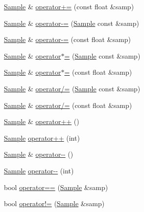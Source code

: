 \begin{DoxyCompactItemize}
\item 
\hyperlink{classDSG_1_1Signal_1_1Sample}{Sample} \& \hyperlink{classDSG_1_1Signal_1_1Sample_afe97756dc97b7080678daab56f384e86}{operator+=} (const float \&samp)
\item 
\hyperlink{classDSG_1_1Signal_1_1Sample}{Sample} \& \hyperlink{classDSG_1_1Signal_1_1Sample_ad945a9ba7bc340f8f106f779f868cf79}{operator-\/=} (\hyperlink{classDSG_1_1Signal_1_1Sample}{Sample} const \&samp)
\item 
\hyperlink{classDSG_1_1Signal_1_1Sample}{Sample} \& \hyperlink{classDSG_1_1Signal_1_1Sample_ac904a07cc0ebde60355362834d0e8ee2}{operator-\/=} (const float \&samp)
\item 
\hyperlink{classDSG_1_1Signal_1_1Sample}{Sample} \& \hyperlink{classDSG_1_1Signal_1_1Sample_a2437b567b3844eab8061889b3036eace}{operator$\ast$=} (\hyperlink{classDSG_1_1Signal_1_1Sample}{Sample} const \&samp)
\item 
\hyperlink{classDSG_1_1Signal_1_1Sample}{Sample} \& \hyperlink{classDSG_1_1Signal_1_1Sample_a5bd4a3dc84cb53e54bf1c368c03d3300}{operator$\ast$=} (const float \&samp)
\item 
\hyperlink{classDSG_1_1Signal_1_1Sample}{Sample} \& \hyperlink{classDSG_1_1Signal_1_1Sample_a767687d8add95ca845ba8b98eadb9d59}{operator/=} (\hyperlink{classDSG_1_1Signal_1_1Sample}{Sample} const \&samp)
\item 
\hyperlink{classDSG_1_1Signal_1_1Sample}{Sample} \& \hyperlink{classDSG_1_1Signal_1_1Sample_ac79e04d684522f84cb05c2fd31fc1ec1}{operator/=} (const float \&samp)
\item 
\hyperlink{classDSG_1_1Signal_1_1Sample}{Sample} \& \hyperlink{classDSG_1_1Signal_1_1Sample_af0cf64d2cc8c618cca08c34636bd6232}{operator++} ()
\item 
\hyperlink{classDSG_1_1Signal_1_1Sample}{Sample} \hyperlink{classDSG_1_1Signal_1_1Sample_a24fcedcacfe341ec9bc6cbf78f32ddc4}{operator++} (int)
\item 
\hyperlink{classDSG_1_1Signal_1_1Sample}{Sample} \& \hyperlink{classDSG_1_1Signal_1_1Sample_a3cfd6b56e17599ac3823b4dceea8ca80}{operator-\/-\/} ()
\item 
\hyperlink{classDSG_1_1Signal_1_1Sample}{Sample} \hyperlink{classDSG_1_1Signal_1_1Sample_a5d695d2ce70db12b6b831f38e0545c9a}{operator-\/-\/} (int)
\item 
bool \hyperlink{classDSG_1_1Signal_1_1Sample_ad49f5a46a63ad3622d1380afbbe8d3f4}{operator==} (\hyperlink{classDSG_1_1Signal_1_1Sample}{Sample} \&samp)
\item 
bool \hyperlink{classDSG_1_1Signal_1_1Sample_aa5c649b9631746923e5bcca2be0e1dc5}{operator!=} (\hyperlink{classDSG_1_1Signal_1_1Sample}{Sample} \&samp)
\end{DoxyCompactItemize}
